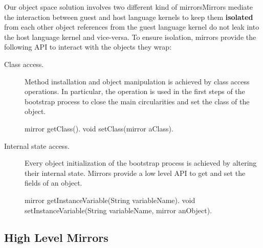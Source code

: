 Our object space solution involves two different kind of mirrorsMirrors mediate the interaction between guest and host language kernels to keep them \textbf{isolated} from each other \ie object references from the guest language kernel do not leak into the host language kernel and vice-versa. To ensure isolation, mirrors provide the following API to interact with the objects they wrap:

\begin{description}

\item[Class access.] Method installation and object manipulation is achieved by class access operations. In particular, the  operation is used in the first steps of the bootstrap process to close the main circularities and set the class of the  object.
\begin{code}
mirror getClass().
void setClass(mirror aClass).
\end{code}

\item[Internal state access.] Every object initialization of the bootstrap process is achieved by altering their internal state. Mirrors provide a low level API to get and set the fields of an object.
\begin{code}
mirror getInstanceVariable(String variableName).
void setInstanceVariable(String variableName, mirror anObject).
\end{code}


\end{description}

\subsection{High Level Mirrors}



